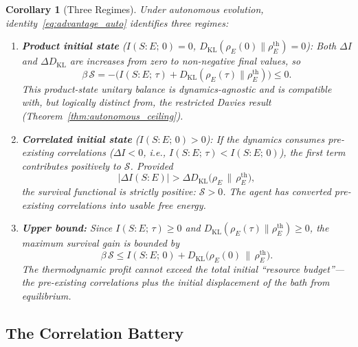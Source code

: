 \documentclass[12pt]{article}
\newtheorem{corollary}[theorem]{Corollary}
\begin{document}
\begin{corollary}[Three Regimes]
\label{cor:three_regimes}
Under autonomous evolution, identity~\eqref{eq:advantage_auto}
identifies three regimes:
\begin{enumerate}
\item \textbf{Product initial state}
  ($I(S{:}E;\, 0) = 0$,
  $D_{\mathrm{KL}}(\rho_E(0) \| \rho_E^{\mathrm{th}}) = 0$):
  Both $\Delta I$ and $\Delta D_{\mathrm{KL}}$ are increases
  from zero to non-negative final values, so
  \[
  \beta\,\mathcal{S}
  = -\bigl(I(S{:}E;\,\tau)
  + D_{\mathrm{KL}}(\rho_E(\tau) \| \rho_E^{\mathrm{th}})\bigr)
  \leq 0.
  \]
  This product-state unitary balance is dynamics-agnostic and is
  compatible with, but logically distinct from, the restricted Davies
  result (Theorem~\ref{thm:autonomous_ceiling}).

\item \textbf{Correlated initial state}
  ($I(S{:}E;\, 0) > 0$):
  If the dynamics \emph{consumes} pre-existing correlations
  ($\Delta I < 0$, i.e., $I(S{:}E;\, \tau) < I(S{:}E;\, 0)$),
  the first term contributes \emph{positively} to
  $\mathcal{S}$.
  Provided
  \begin{equation}
  \label{eq:ceiling_breach}
  |\Delta I(S{:}E)| > \Delta D_{\mathrm{KL}}\!\bigl(\rho_E
  \,\big\|\, \rho_E^{\mathrm{th}}\bigr),
  \end{equation}
  the survival functional is strictly positive:
  $\mathcal{S} > 0$.
  The agent has converted pre-existing correlations into
  usable free energy.

\item \textbf{Upper bound:}
  Since $I(S{:}E;\, \tau) \geq 0$ and
  $D_{\mathrm{KL}}(\rho_E(\tau) \| \rho_E^{\mathrm{th}})
  \geq 0$, the maximum survival gain is bounded by
  \begin{equation}
  \label{eq:S_upper}
  \beta\,\mathcal{S}
  \leq I(S{:}E;\, 0)
    + D_{\mathrm{KL}}\!\bigl(\rho_E(0) \,\big\|\,
      \rho_E^{\mathrm{th}}\bigr).
  \end{equation}
  The thermodynamic profit cannot exceed the total initial
  ``resource budget''---the pre-existing correlations plus
  the initial displacement of the bath from equilibrium.
\end{enumerate}
\end{corollary}

\subsection{The Correlation Battery}
\end{document}
